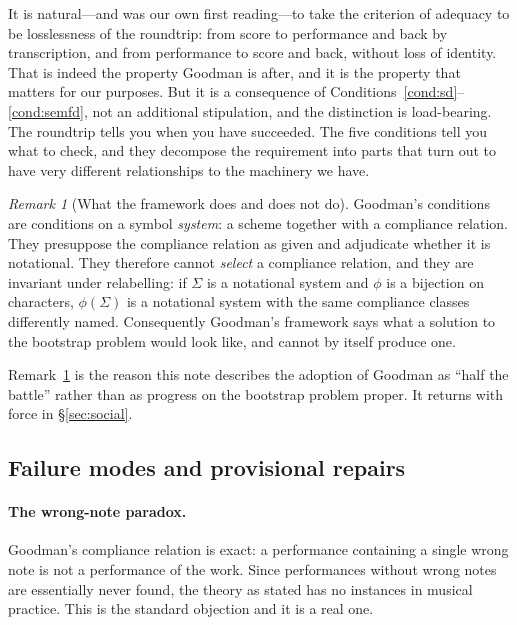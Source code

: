 \documentclass[11pt,a4paper]{article}
\theoremstyle{definition}
\theoremstyle{plain}
\theoremstyle{remark}
\newtheorem{remark}[definition]{Remark}
\begin{document}
It is natural---and was our own first reading---to take the criterion of adequacy to be
losslessness of the roundtrip: from score to performance and back by transcription, and
from performance to score and back, without loss of identity. That is indeed the property
Goodman is after, and it is the property that matters for our purposes. But it is a
consequence of Conditions~\ref{cond:sd}--\ref{cond:semfd}, not an additional stipulation,
and the distinction is load-bearing. The roundtrip tells you when you have succeeded. The
five conditions tell you what to check, and they decompose the requirement into parts that
turn out to have very different relationships to the machinery we have.

\begin{remark}[What the framework does and does not do]
\label{rem:invariance}
Goodman's conditions are conditions on a symbol \emph{system}: a scheme together with a
compliance relation. They presuppose the compliance relation as given and adjudicate
whether it is notational. They therefore cannot \emph{select} a compliance relation, and
they are invariant under relabelling: if $\Sigma$ is a notational system and $\phi$ is a
bijection on characters, $\phi(\Sigma)$ is a notational system with the same compliance
classes differently named. Consequently Goodman's framework says what a solution to the
bootstrap problem would look like, and cannot by itself produce one.
\end{remark}

\noindent Remark~\ref{rem:invariance} is the reason this note describes the adoption of
Goodman as ``half the battle'' rather than as progress on the bootstrap problem proper. It
returns with force in \S\ref{sec:social}.

\subsection{Failure modes and provisional repairs}
\label{sec:failures}

\paragraph{The wrong-note paradox.} Goodman's compliance relation is exact: a performance
containing a single wrong note is not a performance of the work. Since performances
without wrong notes are essentially never found, the theory as stated has no instances in
musical practice. This is the standard objection and it is a real one.
\end{document}
